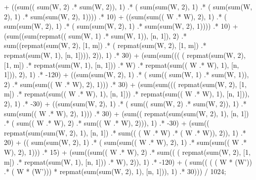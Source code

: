\documentclass{article}
\begin{document}
              + ((sum(( sum(W, 2) .* sum(W, 2)), 1)  .* ( sum(sum(W, 2), 1) .* ( sum(sum(W, 2), 1) .* sum(sum(W, 2), 1))))  .* 10)  
              + ((sum(sum(( W .* W), 2), 1)  .* ( sum(sum(W, 2), 1) .* ( sum(sum(W, 2), 1) .* sum(sum(W, 2), 1))))  .* 10)  
              + (sum((sum(repmat(( sum(W, 1) .* sum(W, 1)), [n, 1]), 2)  .* sum((repmat(sum(W, 2), [1, m])  .* ( repmat(sum(W, 2), [1, m]) .* repmat(sum(W, 1), [n, 1]))), 2)), 1)  .* 30)  
              + (sum(sum((( ( repmat(sum(W, 2), [1, m]) .* repmat(sum(W, 1), [n, 1])) .* W)  .* repmat(sum(( W .* W), 1), [n, 1])), 2), 1)  .* -120)  
              + ((sum(sum(W, 2), 1)  .* ( sum(( sum(W, 1) .* sum(W, 1)), 2) .* sum(sum(( W .* W), 2), 1)))  .* 30)  
              + (sum(sum((( repmat(sum(W, 2), [1, m]) .* repmat(sum(( W .* W), 1), [n, 1]))  .* repmat(sum(( W .* W), 1), [n, 1])), 2), 1)  .* -30)  
              + ((sum(sum(W, 2), 1)  .* ( sum(( sum(W, 2) .* sum(W, 2)), 1) .* sum(sum(( W .* W), 2), 1)))  .* 30)  
              + (sum(( repmat(sum(sum(W, 2), 1), [n, 1]) .* ( sum(( W .* W), 2) .* sum(( W .* W), 2))), 1)  .* -30)  
              + (sum(( repmat(sum(sum(W, 2), 1), [n, 1]) .* sum(( ( W .* W) .* ( W .* W)), 2)), 1)  .* 20)  
              + (( sum(sum(W, 2), 1) .* ( sum(sum(( W .* W), 2), 1) .* sum(sum(( W .* W), 2), 1)))  .* 15)  
              + (sum((sum(( W .* W), 2)  .* sum(( ( repmat(sum(W, 2), [1, m]) .* repmat(sum(W, 1), [n, 1])) .* W), 2)), 1)  .* -120)  + ( sum(( ( ( W * (W')) .* ( W * (W'))) * repmat(sum(sum(W, 2), 1), [n, 1])), 1) .* 30))) / 1024; 
\end{document}
